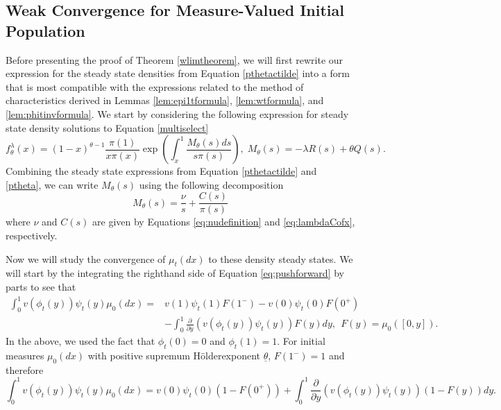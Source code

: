 \documentclass[11pt]{article}
\numberwithin{equation}{section}
\newcommand{\holder}{H{\"o}lder\:}
\newcommand{\paren}[1]{\left(#1\right)}
\newcommand{\PD}[2]{\frac{\partial#1}{\partial#2}}
\begin{document}
{\subsection{Weak Convergence for Measure-Valued Initial Population} \label{sec:weakconvergencesteady}

Before presenting the proof of Theorem \ref{wlimtheorem}, we will first rewrite our expression for the steady state densities from Equation \eqref{pthetactilde} into a form that is most compatible with the expressions related to the method of characteristics derived in Lemmas \ref{lem:epi1tformula}, \ref{lem:wtformula}, and \ref{lem:phitinvformula}. We start by considering the following expression for steady state density solutions to Equation \eqref{multiselect}
\begin{equation}\label{ptheta}
f^{\lambda}_{\theta}(x)=(1-x)^{\theta-1}\frac{\pi(1)}{x\pi(x)}\exp\paren{\int_x^1\frac{M_{\theta}(s)ds}{s\pi(s)}}, \; M_{\theta}(s)=-\lambda R(s)+\theta Q(s).
\end{equation}
Combining the steady state expressions from Equation \eqref{pthetactilde} and \eqref{ptheta}, we can write $M_{\theta}(s)$ using the following decomposition
\begin{equation} \label{eq:Mdecomp}
    M_{\theta}(s) = \frac{\nu}{s} + \frac{C(s)}{\pi(s)}
\end{equation}
where $\nu$ and $C(s)$ are given by Equations \eqref{eq:nudefinition} and \eqref{eq:lambdaCofx}, respectively.
 

Now we will study the convergence of $\mu_t(dx)$ to these density steady states. We will start by the integrating the righthand side of Equation \eqref{eq:pushforward} by parts to see that
\begin{equation}
\begin{split}
\int_0^1 v(\phi_t(y))\psi_t(y)\mu_0(dx)=&v(1)\psi_t(1)F(1^-)-v(0)\psi_t(0)F(0^+)\\
&-\int_0^1\PD{}{y}\paren{v(\phi_t(y))\psi_t(y)}F(y) dy, \: \: F(y)=\mu_0([0,y]).
\end{split}
\end{equation}
In the above, we used the fact that $\phi_t(0)=0$ and $\phi_t(1)=1$.
For initial measures $\mu_0(dx)$ with positive supremum \holder exponent $\underline{\theta}$, $F(1^-)=1$ and therefore 
\begin{equation}\label{vpsimu0}
\int_0^1 v(\phi_t(y))\psi_t(y)\mu_0(dx)=v(0)\psi_t(0)(1-F(0^+))
+\int_0^1\PD{}{y}\paren{v(\phi_t(y))\psi_t(y)}(1-F(y))dy.
\end{equation}

}
\end{document}
